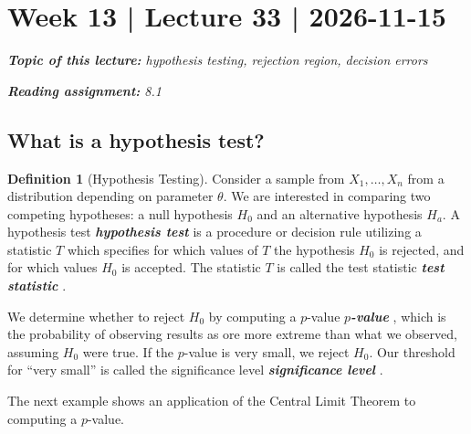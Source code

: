 \documentclass[10pt]{article}
\theoremstyle{definition}
\newtheorem{definition}[theorem]{Definition}
\newcommand{\1}[1]{\textbf{1}_{\left[#1\right]}} %
\DeclareRobustCommand{\demph}[1]{%
  \ifmmode
  {\color{Blue}#1}%
  \else
  {\color{Blue}\bfseries\slshape #1}%
  \fi
}
\begin{document}
\newpage
\section{Week 13 | Lecture 33 | 2026-11-15}
\begin{center}
  \begin{tcolorbox}[width=0.9\textwidth, colback=white, colframe=black]
    \textit{\textbf{Topic of this lecture:} hypothesis testing, rejection
      region, decision errors}

    \textit{\textbf{Reading assignment:} 8.1}
  \end{tcolorbox}
\end{center}


\subsection{What is a hypothesis test?}
\begin{definition}[Hypothesis Testing]
  \label{def:hypothesis-testing}
  Consider a sample from $X_{1},\ldots,X_{n}$ from a distribution depending on
  parameter $\theta$. We are interested in comparing two competing
  hypotheses: a null hypothesis $H_{0}$ and an alternative hypothesis $H_{a}$.
  A \demph{hypothesis test} is a procedure or decision rule utilizing a
  statistic $T$ which specifies for which values of $T$ the hypothesis $H_{0}$
  is rejected, and for which values $H_{0}$ is accepted. The statistic $T$ is
  called the \demph{test statistic}.

  We determine whether to reject $H_{0}$ by computing a \demph{$p$-value},
  which is the probability of observing results as ore more extreme than what
  we observed, assuming $H_{0}$ were true. If the $p$-value is very small, we
  reject $H_{0}$. Our threshold for ``very small'' is called the
  \demph{significance level}.
\end{definition}

The next example shows an application of the Central Limit Theorem to
computing a $p$-value.
\end{document}
